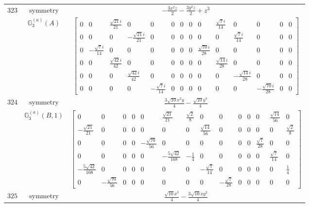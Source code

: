 \documentclass[fleqn,8pt,landscape]{jsarticle}
\begin{document}
\begin{longtable}{ccc}
$ 323 $ & $ \text{symmetry} $ & $ - \frac{3 x^{2} z}{2} - \frac{3 y^{2} z}{2} + z^{3} $ \\
$  $ & $ \mathbb{G}_{3}^{(a)}(A) $ & $ \begin{bmatrix} 0 & 0 & \frac{\sqrt{21} i}{21} & 0 & 0 & 0 & 0 & 0 & 0 & \frac{\sqrt{7} i}{14} & 0 & 0 & 0 & 0 \\ 0 & 0 & 0 & - \frac{\sqrt{21} i}{21} & 0 & 0 & 0 & 0 & 0 & 0 & \frac{\sqrt{7} i}{14} & 0 & 0 & 0 \\ 0 & - \frac{\sqrt{7} i}{14} & 0 & 0 & 0 & 0 & 0 & 0 & \frac{\sqrt{70} i}{28} & 0 & 0 & 0 & 0 & 0 \\ 0 & 0 & \frac{\sqrt{42} i}{42} & 0 & 0 & 0 & 0 & 0 & 0 & \frac{\sqrt{14} i}{28} & 0 & 0 & 0 & 0 \\ 0 & 0 & 0 & \frac{\sqrt{42} i}{42} & 0 & 0 & 0 & 0 & 0 & 0 & - \frac{\sqrt{14} i}{28} & 0 & 0 & 0 \\ 0 & 0 & 0 & 0 & - \frac{\sqrt{7} i}{14} & 0 & 0 & 0 & 0 & 0 & 0 & - \frac{\sqrt{70} i}{28} & 0 & 0 \end{bmatrix} $ \\ \hline
$ 324 $ & $ \text{symmetry} $ & $ \frac{3 \sqrt{10} x^{2} y}{4} - \frac{\sqrt{10} y^{3}}{4} $ \\
$  $ & $ \mathbb{G}_{3}^{(a)}(B,1) $ & $ \begin{bmatrix} 0 & 0 & 0 & 0 & 0 & \frac{\sqrt{21}}{21} & \frac{\sqrt{2}}{8} & 0 & 0 & 0 & 0 & 0 & \frac{\sqrt{14}}{56} & 0 \\ - \frac{\sqrt{21}}{21} & 0 & 0 & 0 & 0 & 0 & 0 & \frac{\sqrt{14}}{56} & 0 & 0 & 0 & 0 & 0 & \frac{\sqrt{2}}{8} \\ 0 & 0 & 0 & 0 & - \frac{\sqrt{70}}{56} & 0 & 0 & 0 & 0 & 0 & 0 & \frac{\sqrt{7}}{28} & 0 & 0 \\ 0 & 0 & 0 & 0 & 0 & - \frac{5 \sqrt{42}}{168} & - \frac{1}{4} & 0 & 0 & 0 & 0 & 0 & \frac{\sqrt{7}}{14} & 0 \\ - \frac{5 \sqrt{42}}{168} & 0 & 0 & 0 & 0 & 0 & 0 & - \frac{\sqrt{7}}{14} & 0 & 0 & 0 & 0 & 0 & \frac{1}{4} \\ 0 & - \frac{\sqrt{70}}{56} & 0 & 0 & 0 & 0 & 0 & 0 & - \frac{\sqrt{7}}{28} & 0 & 0 & 0 & 0 & 0 \end{bmatrix} $ \\ \hline
$ 325 $ & $ \text{symmetry} $ & $ \frac{\sqrt{10} x^{3}}{4} - \frac{3 \sqrt{10} x y^{2}}{4} $ \\

\end{longtable}
\end{document}

